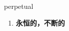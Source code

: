 
\begin{frame}
{\huge perpetual}
\begin{center}
\begin{enumerate}\Large
  \item \textbf{永恒的，不断的}
\end{enumerate}
\end{center}
\end{frame}
